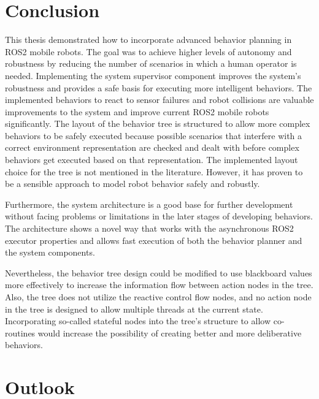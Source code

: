 \chapter{Conclusion}
\label{cha:diskussion}

This thesis demonstrated how to incorporate advanced behavior planning in ROS2 mobile robots. The goal was to achieve higher levels of autonomy and robustness by reducing the number of scenarios in which a human operator is needed. Implementing the system supervisor component improves the system's robustness and provides a safe basis for executing more intelligent behaviors. The implemented behaviors to react to sensor failures and robot collisions are valuable improvements to the system and improve current ROS2 mobile robots significantly. The layout of the behavior tree is structured to allow more complex behaviors to be safely executed because possible scenarios that interfere with a correct environment representation are checked and dealt with before complex behaviors get executed based on that representation. 
The implemented layout choice for the tree is not mentioned in the literature. However, it has proven to be a sensible approach to model robot behavior safely and robustly. 

Furthermore, the system architecture is a good base for further development without facing problems or limitations in the later stages of developing behaviors. The architecture shows a novel way that works with the asynchronous ROS2 executor properties and allows fast execution of both the behavior planner and the system components. 

Nevertheless, the behavior tree design could be modified to use blackboard values more effectively to increase the information flow between action nodes in the tree. Also, the tree does not utilize the reactive control flow nodes, and no action node in the tree is designed to allow multiple threads at the current state. Incorporating so-called stateful nodes into the tree's structure to allow co-routines would increase the possibility of creating better and more deliberative behaviors. 

\chapter{Outlook}
\label{cha:outlook}

